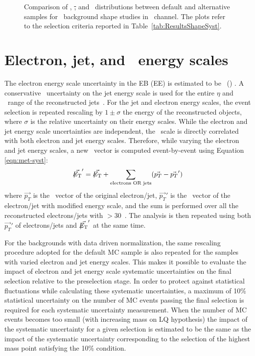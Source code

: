 \begin{figure}[htbp]
\begin{center}
\begin{tabular}{cc}
    \end{tabular}
    \caption{Comparison of \MET, \st, and \mej~distributions 
    between default and alternative samples for \ttbar~background shape studies in \enujj~channel.
    The plots refer to the selection criteria reported in Table~\ref{tab:ResultsShapeSyst}.}
    \label{fig:ResultsShapeSystTTbar}
  \end{center}
\end{figure}   


\section{Electron, jet, and \MET~energy scales}
\label{jetenergyscale}

The electron energy scale uncertainty in the EB 
(EE) is estimated to be \EESEB~(\EESEE) \cite{EES}.
A conservative \JES~uncertainty on the jet energy scale is used for the  
entire $\eta$ and \pt~range of the reconstructed jets~\cite{JES}.
For the jet and electron energy scales, 
the event selection is repeated rescaling by $1 \pm \sigma$ the energy of the reconstructed 
objects, where $\sigma$ is the relative uncertainty on their energy scales. While the electron and jet energy scale 
uncertainties are independent, the \MET~scale is directly correlated with both electron and jet energy scales. 
Therefore, while varying the electron and jet energy scales, a new \MET~vector is computed event-by-event using
Equation \ref{eqn:met-syst}:
\begin{equation}
  \vec{\mbox{\ensuremath{\not\!\!{E_{\text{T}}}}}}' = \vec{\mbox{\ensuremath{\not\!\!{E_{\text{T}}}}}} + \sum_{\text{electrons OR jets}} (\vec{p_T}-\vec{p_T}') 
  \label{eqn:met-syst}
\end{equation} 
where $\vec{p_T}$ is the \pt~vector of the original electron/jet, 
$\vec{p_T}'$ is the \pt~vector of the electron/jet with modified energy scale, 
and the sum is performed over all the reconstructed electrons/jets with \pt$>$30~\GeV. 
The analysis is then repeated using both $\vec{p_T}'$ of electrons/jets 
and $\vec{\mbox{\ensuremath{\not\!\!{E_{\text{T}}}}}}'$ at the same time. 

For the backgrounds with data driven normalization, the same 
rescaling procedure adopted for the default MC sample is also repeated 
for the samples with varied electron and jet energy scales. 
This makes it possible to 
evaluate the impact of electron and jet energy scale systematic uncertainties
on the final selection relative to the preselection stage.
In order to protect against statistical fluctuations
while calculating these systematic uncertainties, 
a maximum of 10\% statistical uncertainty on the number of MC events passing the final selection
is required for each systematic uncertainty measurement.
When the number of MC events becomes too small (with increasing mass on LQ hypothesis) 
the impact of the systematic uncertainty for a given selection is estimated to be the same as the 
impact of the systematic uncertainty corresponding to the selection of the 
highest mass point satisfying the 10\% condition.

